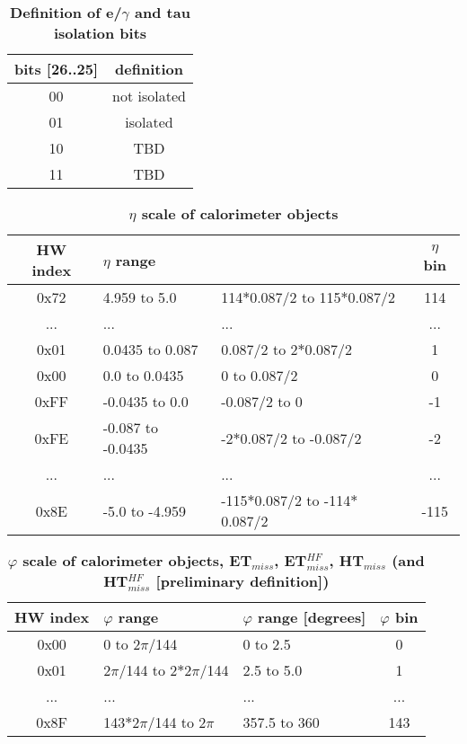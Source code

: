 \documentclass{cmspaper}
\begin{document}
\begin{table}[ht]
\caption{\bf Definition of e/$\gamma$ and tau isolation bits}
\vspace{5mm}
\centering
\begin{tabular}{|c|c|}\hline
bits [26..25] & definition \\\hline\hline
00 & not isolated \\
01 & isolated \\
10 & TBD \\
11 & TBD \\\hline
\end{tabular}
\label{table:eg_tau_iso_bits}
\end{table}

\begin{table}[ht]
\caption{\bf $\eta$ scale of calorimeter objects}
\vspace{5mm}
\centering
\begin{tabular}{|c|l|l|c|}\hline
HW index & $\eta$ range &  & $\eta$ bin \\\hline\hline
0x72 & 4.959 to 5.0 & 114$*$0.087/2 to 115$*$0.087/2 & 114\\\hline
... & ... & ... & ...\\\hline
0x01 & 0.0435 to 0.087 & 0.087/2 to 2$*$0.087/2 & 1\\\hline
0x00 & 0.0 to 0.0435 & 0 to 0.087/2 & 0\\\hline
0xFF & -0.0435 to 0.0 & -0.087/2 to 0 & -1\\\hline
0xFE & -0.087 to -0.0435  & -2$*$0.087/2 to -0.087/2 & -2\\\hline
... & ... & ... & ...\\\hline
0x8E & -5.0 to -4.959 & -115$*$0.087/2 to -114$*$0.087/2 & -115\\\hline
\end{tabular}
\label{table:calo_eta_scale}
\end{table}

\begin{table}[ht]
\caption{\bf $\varphi$ scale of calorimeter objects, ET$_{miss}$, ET$_{miss}^{HF}$, HT$_{miss}$ (and HT$_{miss}^{HF}$ [preliminary definition])}
\vspace{5mm}
\centering
\begin{tabular}{|c|l|l|c|}\hline
HW index & $\varphi$ range & $\varphi$ range [degrees] & $\varphi$ bin\\\hline\hline
0x00 & 0 to 2$\pi$/144 & 0 to 2.5 & 0\\\hline
0x01 & 2$\pi$/144 to 2$*$2$\pi$/144 & 2.5 to 5.0 & 1\\\hline
... & ... & ... & ...\\\hline
0x8F & 143$*$2$\pi$/144 to 2$\pi$ & 357.5 to 360 & 143\\\hline
\end{tabular}
\label{table:calo_phi_scale}
\end{table}
\end{document}

